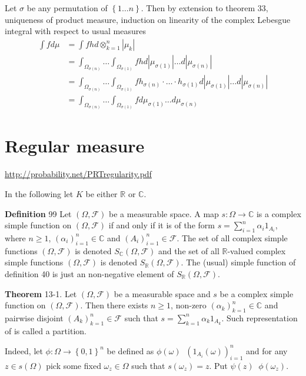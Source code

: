 \documentclass[a4paper]{article}
\newcommand{\obj}[1]{\left\{ #1 \right \}}
\newcommand{\brac}[1]{\left ( #1 \right )}
\newcommand{\abs}[1]{\left | #1 \right |}
\newcommand{\Real}{\mathbb{R}}
\newcommand{\Cplx}{\mathbb{C}}
\newcommand{\Fcal}{\mathcal{F}}
\newcommand{\defn}{\mathop{\overset{\Delta}{=}}\nolimits}
\begin{document}
Let $\sigma$ be any permutation of $\obj{1\ldots n}$. Then by extension to theorem 33, uniqueness of product measure, induction on linearity of the complex Lebesgue integral with respect to usual measures \begin{align*}\int f d\mu &= \int f h d\otimes_{k=1}^n \abs{\mu_k}\\&= \int_{\Omega_{\sigma\brac{n}}}\ldots \int_{\Omega_{\sigma\brac{1}}} f h d\abs{\mu_{\sigma\brac{1}}} \ldots d\abs{\mu_{\sigma\brac{n}}}\\&= \int_{\Omega_{\sigma\brac{n}}}\ldots \int_{\Omega_{\sigma\brac{1}}} f h_{\sigma\brac{n}} \cdot \ldots \cdot h_{\sigma\brac{1}} d\abs{\mu_{\sigma\brac{1}}} \ldots d\abs{\mu_{\sigma\brac{n}}}\\&=\int_{\Omega_{\sigma\brac{n}}}\ldots \int_{\Omega_{\sigma\brac{1}}} f d\mu_{\sigma\brac{1}} \ldots d\mu_{\sigma\brac{n}}\end{align*} 


\section{Regular measure} %
\label{sec:tut_13}
\url{http://probability.net/PRTregularity.pdf}

In the following let $K$ be either $\Real$ or $\Cplx$.

\noindent \textbf{Definition} 99
Let $\brac{\Omega, \Fcal}$ be a measurable space. A map $s:\Omega\to \Cplx$ is a complex simple function on $\brac{\Omega,\Fcal}$ if and only if it is of the form $s = \sum_{i=1}^n \alpha_i 1_{A_i}$, where $n\geq1$, $\brac{\alpha_i}_{i=1}^n\in \Cplx$ and $\brac{A_i}_{i=1}^n\in \Fcal$. The set of all complex simple functions $\brac{\Omega, \Fcal}$ is denoted $S_\Cplx\brac{\Omega, \Fcal}$ and the set of all $\Real$-valued complex simple functions $\brac{\Omega, \Fcal}$ is denoted $S_\Real\brac{\Omega, \Fcal}$. The (usual) simple function of definition 40 is just an non-negative element of $S_\Real\brac{\Omega,\Fcal}$.

\label{thm:cplx_simple_func_partition} \noindent \textbf{Theorem} 13-1.
Let $\brac{\Omega, \Fcal}$ be a measurable space and $s$ be a complex simple function on $\brac{\Omega, \Fcal}$. Then there exists $n\geq 1$, non-zero $\brac{\alpha_k}_{k=1}^n\in\Cplx$ and pairwise disjoint $\brac{A_k}_{k=1}^n\in \Fcal$ such that $s=\sum_{k=1}^n \alpha_k 1_{A_k}$. Such representation of is called a partition.

Indeed, let $\phi:\Omega\to\obj{0,1}^n$ be defined as $\phi\brac{\omega}\defn \brac{1_{A_i}\brac{\omega}}_{i=1}^n$ and for any $z\in s\brac{\Omega}$ pick some fixed $\omega_z\in \Omega$ such that $s\brac{\omega_z}=z$. Put $\psi\brac{z}\defn \phi\brac{\omega_z}$.
\end{document}
